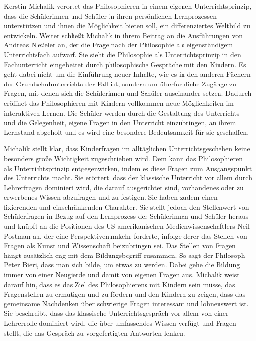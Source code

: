 Kerstin Michalik verortet das Philosophieren in einem eigenen Unterrichtsprinzip, dass die Schülerinnen und Schüler in ihren persönlichen Lernprozessen unterstützen und ihnen die Möglichkeit bieten soll, ein differenziertes Weltbild zu entwickeln\cite[S.\,635]{KM13}. 
Weiter schließt Michalik in ihrem Beitrag an die Ausführungen von Andreas Nießeler an, der die Frage nach der Philosophie als eigenständigem Unterrichtsfach aufwarf. 
Sie sieht die Philosophie als Unterrichtsprinzip in den Fachunterricht eingebettet durch philosophische Gespräche mit den Kindern. 
Es geht dabei nicht um die Einführung neuer Inhalte, wie es in den anderen Fächern des Grundschulunterrichts der Fall ist, sondern um überfachliche Zugänge zu Fragen, mit denen sich die Schülerinnen und Schüler auseinander setzen. 
Dadurch eröffnet das Philosophieren mit Kindern vollkommen neue Möglichkeiten im interaktiven Lernen. 
Die Schüler werden durch die Gestaltung des Unterrichts und die Gelegenheit, eigene Fragen in den Unterricht einzubringen, an ihrem Lernstand abgeholt und es wird eine besondere Bedeutsamkeit für sie geschaffen.

Michalik stellt klar, dass Kinderfragen im alltäglichen Unterrichtsgeschehen keine besonders große Wichtigkeit zugeschrieben wird. 
Dem kann das Philosophieren als Unterrichtsprinzip entgegenwirken, indem es diese Fragen zum Ausgangspunkt des Unterrichts macht. 
Sie erörtert, dass der klassische Unterricht vor allem durch Lehrerfragen dominiert wird, die darauf ausgerichtet sind, vorhandenes oder zu erwerbenes Wissen abzufragen und zu festigen. 
Sie haben zudem einen \glqq fixierenden und einschränkenden Charakter\grqq{}\cite[S.\,635]{KM13}. 
Sie stellt jedoch den Stellenwert von Schülerfragen in Bezug auf den Lernprozess der Schülerinnen und Schüler heraus und knüpft an die Positionen des US-amerikanischen Medienwissenschaftlers Neil Postman an, der eine Perspektivenumkehr forderte, infolge derer das Stellen von Fragen als \glqq Kunst und Wissenschaft beizubringen\grqq{}\cite[S.\,636]{KM13} sei. 
Das Stellen von Fragen hängt zusätzlich eng mit dem Bildungsbegriff zusammen. 
So sagt der Philosoph Peter Bieri, dass man sich bilde, um etwas zu werden. 
Dabei gehe die Bildung immer von einer Neugierde und damit von eigenen Fragen aus.
Michalik weist darauf hin, dass es das Ziel des Philosophierens mit Kindern sein müsse, \glqq das Fragenstellen zu ermutigen und zu fördern und den Kindern zu zeigen, dass das gemeinsame Nachdenken über schwierige Fragen interessant und lohnenswert ist.\grqq{}\cite[S.\,637]{KM13}
Sie beschreibt, dass das klassische Unterrichtsgespräch vor allem von einer Lehrerrolle dominiert wird, die über umfassendes Wissen verfügt und Fragen stellt, die das Gespräch zu vorgefertigten Antworten lenken.

